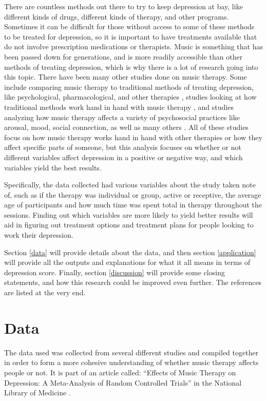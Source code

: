 \documentclass[12pt]{article}
\begin{document}
 There are countless methods out there to try to keep depression at bay, like different kinds of drugs, different kinds of therapy, and other programs. Sometimes it can be difficult for those without access to some of these methods to be treated for depression, so it is important to have treatments available that do not involve prescription medications or therapists. Music is something that has been passed down for generations, and is more readily accessible than other methods of treating depression, which is why there is a lot of research going into this topic. There have been many other studies done on music therapy. Some include comparing music therapy to traditional methods of treating depression, like psychological, pharmacological, and other therapies \citet{Cochrane}, studies looking at how traditional methods work hand in hand with music therapy \citet{British}, and studies analyzing how music therapy affects a variety of psychosocial practices like arousal, mood, social connection, as well as many others \citet{Frontiers}. All of these studies focus on how music therapy works hand in hand with other therapies or how they affect specific parts of someone, but this analysis focuses on whether or not different variables affect depression in a positive or negative way, and which variables yield the best results. 

 Specifically, the data collected had various variables about the study taken note of, such as if the therapy was individual or group, active or receptive, the average age of participants and how much time was spent total in therapy throughout the sessions. Finding out which variables are more likely to yield better results will aid in figuring out treatment options and treatment plans for people looking to work their depression.

 Section \ref{data} will provide details about the data, and then section \ref{application} will provide all the outputs and explanations for what it all means in terms of depression score. Finally, section \ref{discussion} will provide some closing statements, and how this research could be improved even further. The references are listed at the very end.

 \section{Data} 
 \label{sec:data}

 The data used was collected from several different studies and compiled together in order to form a more cohesive understanding of whether music therapy affects people or not. It is part of an article called: “Effects of Music Therapy on Depression: A Meta-Analysis of Random Controlled Trials” in the National Library of Medicine \citet{PLOS}. 
\end{document}
